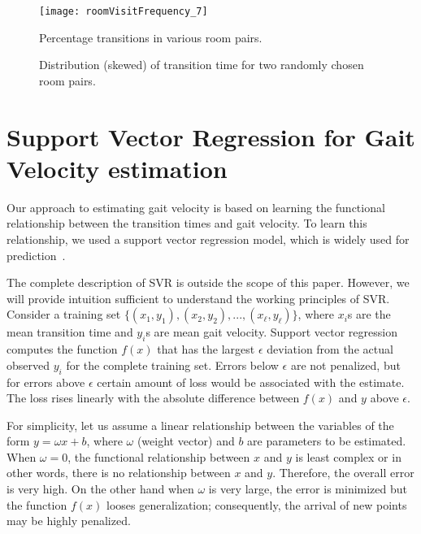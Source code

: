 \documentclass[journal]{IEEEtran}
\begin{document}
\begin{figure}
\centering
\texttt{[image: roomVisitFrequency\_7]}
\caption{Percentage transitions in various room pairs.}
\label{fig:roomVisitFrequency}
\end{figure}


\begin{figure}[ht]
\centering
{}
\caption{Distribution (skewed) of transition time for two randomly chosen room pairs.}
\label{fig:skewedDistribution}
\end{figure}

\section{Support Vector Regression for Gait Velocity estimation}
\label{subsec:svr}



Our approach to estimating gait velocity is based on learning the functional relationship between the transition times and gait velocity.  To learn this relationship, we used a support vector regression model, which is widely used for prediction~\cite{rana2013feasibility,rana2011adaptive}.

The complete description of SVR is outside the scope of this paper. However, we will provide intuition sufficient to understand the working principles of SVR. Consider a training set $\{(x_1,y_1),(x_2,y_2),...,(x_\ell,y_\ell)\}$, where $x_i$s are the mean transition time and $y_i$s are mean gait velocity. Support vector regression computes the function $f(x)$ that has the largest $\epsilon$ deviation from the actual observed $y_i$ for the complete training set.
Errors below $\epsilon$ are not penalized, but for errors above $\epsilon$ certain amount of loss would be associated with the estimate. The loss rises linearly with the absolute difference between $f(x)$ and $y$ above $\epsilon$.



For simplicity, let us assume a linear relationship between the variables of the form $y = \omega x + b$, where $\omega$ (weight vector) and $b$ are parameters to be estimated. 
When $\omega = 0$, the functional relationship between $x$ and $y$ is least complex or in other words, there is no relationship between $x$ and $y$. Therefore, the overall error is very high. On the other hand when $\omega$ is very large, the error is minimized but the function $f(x)$ looses generalization; consequently, the arrival of new points may be highly penalized. 
\end{document}
